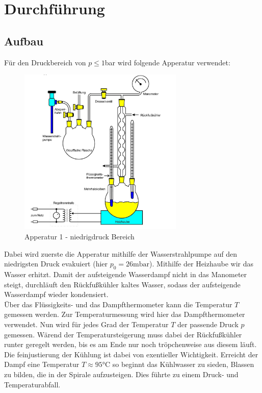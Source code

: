 \section{Durchführung}
\label{sec:Durchfuehrung}
\subsection{Aufbau}
Für den Druckbereich von $p\leq 1$bar wird folgende Apperatur verwendet:
\begin{figure}[H]
    \centering
    \includegraphics[width=0.7\textwidth]{bilder/anlage1.jpg}
    \caption{Apperatur 1 - niedrigdruck Bereich \cite[181]{Anleitung}}
    \label{fig:app1}
\end{figure}
Dabei wird zuerste die Apperatur mithilfe der Wasserstrahlpumpe auf
den niedrigsten Druck evakuiert (hier $p_0=26\mathrm{mbar}$).
Mithilfe der Heizhaube wir das Wasser erhitzt. Damit der aufsteigende Wasserdampf
nicht in das Manometer steigt, durchläuft den Rückfußkühler kaltes Wasser,
sodass der aufsteigende Wasserdampf wieder kondensiert.\\
Über das Flüssigkeits- und das Dampfthermometer kann die Temperatur $T$ gemessen werden.
Zur Temperaturmessung wird hier das Dampfthermometer verwendet. 
Nun wird für jedes Grad der Temperatur $T$ der passende Druck $p$ gemessen.
Wärend der Temperatursteigerung muss dabei der Rückfußkühler runter geregelt werden, bis es am
Ende nur noch tröpchenweise aus diesem läuft.\\
Die feinjustierung der Kühlung ist dabei von exentieller Wichtigkeit.
Erreicht der Dampf eine Temperatur $T \approx 95°$C so beginnt
das Kühlwasser zu sieden, Blassen zu bilden, die in der Spirale
aufzusteigen. Dies führte zu einem Druck- und Temperaturabfall.\\

